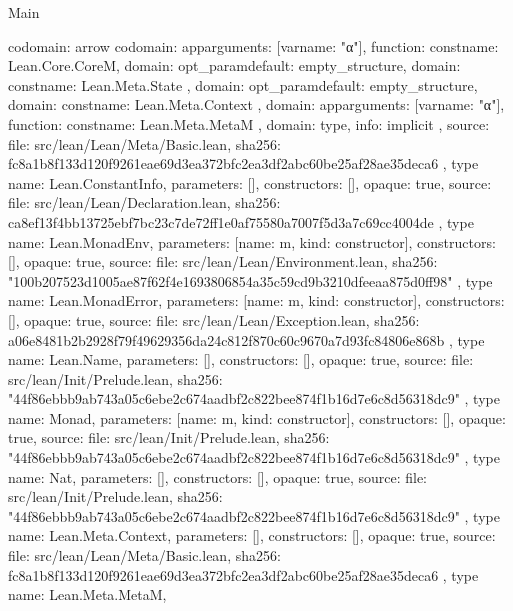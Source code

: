 \begin{lexlean}{Main}
\begin{toolingmodule}
{{{{{            codomain: arrow{
              codomain: app{arguments: [var{name: "α"}], function: const{name: Lean.Core.CoreM}},
              domain: opt_param{default: empty_structure{}, domain: const{name: Lean.Meta.State}}
            },
            domain: opt_param{default: empty_structure{}, domain: const{name: Lean.Meta.Context}}
          },
          domain: app{arguments: [var{name: "α"}], function: const{name: Lean.Meta.MetaM}}
        },
        domain: type{},
        info: implicit
      },
      source: {
        file: src/lean/Lean/Meta/Basic.lean,
        sha256: fc8a1b8f133d120f9261eae69d3ea372bfc2ea3df2abc60be25af28ae35deca6
      }
    },
    type{
      name: Lean.ConstantInfo,
      parameters: [],
      constructors: [],
      opaque: true,
      source: {
        file: src/lean/Lean/Declaration.lean,
        sha256: ca8ef13f4bb13725ebf7bc23c7de72ff1e0af75580a7007f5d3a7c69cc4004de
      }
    },
    type{
      name: Lean.MonadEnv,
      parameters: [{name: m, kind: constructor{}}],
      constructors: [],
      opaque: true,
      source: {
        file: src/lean/Lean/Environment.lean,
        sha256: "100b207523d1005ae87f62f4e1693806854a35c59cd9b3210dfeeaa875d0ff98"
      }
    },
    type{
      name: Lean.MonadError,
      parameters: [{name: m, kind: constructor{}}],
      constructors: [],
      opaque: true,
      source: {
        file: src/lean/Lean/Exception.lean,
        sha256: a06e8481b2b2928f79f49629356da24c812f870c60c9670a7d93fc84806e868b
      }
    },
    type{
      name: Lean.Name,
      parameters: [],
      constructors: [],
      opaque: true,
      source: {
        file: src/lean/Init/Prelude.lean,
        sha256: "44f86ebbb9ab743a05c6ebe2c674aadbf2c822bee874f1b16d7e6c8d56318dc9"
      }
    },
    type{
      name: Monad,
      parameters: [{name: m, kind: constructor{}}],
      constructors: [],
      opaque: true,
      source: {
        file: src/lean/Init/Prelude.lean,
        sha256: "44f86ebbb9ab743a05c6ebe2c674aadbf2c822bee874f1b16d7e6c8d56318dc9"
      }
    },
    type{
      name: Nat,
      parameters: [],
      constructors: [],
      opaque: true,
      source: {
        file: src/lean/Init/Prelude.lean,
        sha256: "44f86ebbb9ab743a05c6ebe2c674aadbf2c822bee874f1b16d7e6c8d56318dc9"
      }
    },
    type{
      name: Lean.Meta.Context,
      parameters: [],
      constructors: [],
      opaque: true,
      source: {
        file: src/lean/Lean/Meta/Basic.lean,
        sha256: fc8a1b8f133d120f9261eae69d3ea372bfc2ea3df2abc60be25af28ae35deca6
      }
    },
    type{
      name: Lean.Meta.MetaM,
}}
\end{toolingmodule}
\end{lexlean}
